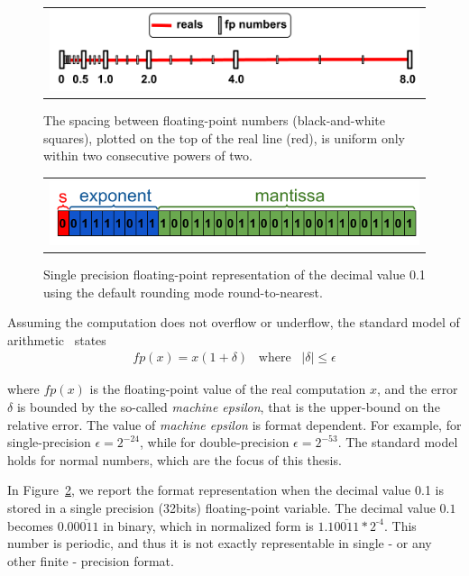 %
\begin{figure}[tb!]
	\centering
	\begin{tabular}{l}
		\includegraphics[width=1.0\textwidth]{pic/fpnumbers.png}
	\end{tabular}
	\caption{The spacing between floating-point numbers (black-and-white squares), plotted on the top of the real line (red), is uniform only within two consecutive powers of two.}
	\label{fig:line}
\end{figure}
%
\begin{figure}[tb!]
	\centering
	\begin{tabular}{l}
		\includegraphics[width=1.0\textwidth]{pic/examplenumber.png}
	\end{tabular}
	\caption{Single precision floating-point representation of the decimal value 0.1 using the default rounding mode round-to-nearest.}
	\label{fig:zeropointone}
\end{figure}
%

Assuming the computation does not overflow or underflow, the standard model of arithmetic~\cite{every} states
%
\begin{align}
fp(x)=x(1+\delta)\;\;\;\text{where}\;\;\;|\delta|\leq\epsilon
\label{standard}
\end{align}
%

where $fp(x)$ is the floating-point value of the real computation $x$, and the error $\delta$ is bounded by the so-called \emph{machine epsilon}, that is the upper-bound on the relative error.
%
The value of \emph{machine epsilon} is format dependent.
%
For example, for single-precision $\epsilon=2^{-24}$, while for double-precision $\epsilon=2^{-53}$.
%
The standard model holds for normal numbers, which are the focus of this thesis.
%

In Figure~\ref{fig:zeropointone}, we report the format representation when the decimal value 0.1 is stored in a single precision (32bits) floating-point variable.
%
The decimal value $0.1$ becomes $0.0\overline{0011}$ in binary, which in normalized form is $1.1\overline{0011}*2^{\text{-}4}$.
%
This number is periodic, and thus it is not exactly representable in single - or any other finite - precision format.
%

